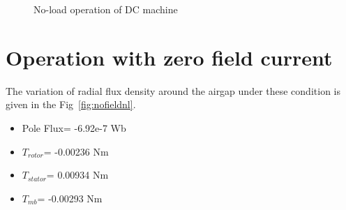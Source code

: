 \documentclass[a4paper,11pt]{article}
\begin{document}
\begin{figure}[h!]
  \quad
  \caption{No-load operation of DC machine}
\end{figure}

\section{Operation with zero field current}
The variation of radial flux density around the airgap under these condition is given in the Fig~\ref{fig:nofieldnl}.

\begin{itemize}
\item Pole Flux= -6.92e-7 Wb
\item $T_{rotor}$= -0.00236 Nm
\item $T_{stator}$= 0.00934 Nm
\item $T_{mb}$= -0.00293 Nm
\end{itemize}
\end{document}
